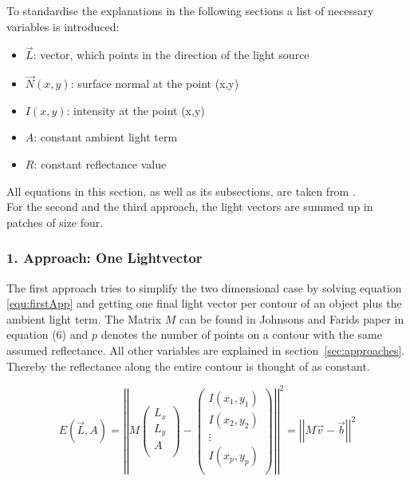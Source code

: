 To standardise the explanations in the following sections a list of necessary variables is introduced: 
\begin{itemize}
\item $\vec{L}$: vector, which points in the direction of the light source 
\item $\vec{N}(x,y)$: surface normal at the point (x,y) 
\item $I(x,y)$: intensity at the point (x,y)
\item $A$: constant ambient light term
\item $R$: constant reflectance value
\end{itemize}
All equations in this section, as well as its subsections, are taken from \cite{Johnson}. \\
For the second and the third approach, the light vectors are summed up in patches of size four. 

\subsubsection{1. Approach: One Lightvector}\label{sec:appOne}
The first approach tries to simplify the two dimensional case by solving equation \ref{equ:firstApp} and getting one final light vector per contour of an object plus the ambient light term. The Matrix $M$ can be found in Johnsons and Farids paper \cite{Johnson} in equation (6) and $p$ denotes the number of points on a contour with the same assumed reflectance. All other variables are explained in section~\ref{sec:approaches}. Thereby the reflectance along the entire contour is thought of as constant. 

\begin{equation}
\label{equ:firstApp}
E(\vec{L} , A) = 
\left\vert \left\vert 
M
\begin{pmatrix}
L_{x} \\
L_{y} \\
A \\
\end{pmatrix} -
\begin{pmatrix}
I(x_{1} , y_{1}) \\
I(x_{2} , y_{2}) \\
\vdots \\
I(x_{p} , y_{p}) \\
\end{pmatrix}
 \right\vert\right\vert^{2}
 = \left\vert \left\vert  M\vec{v}-\vec{b}  \right\vert\right\vert^{2}
\end{equation}

